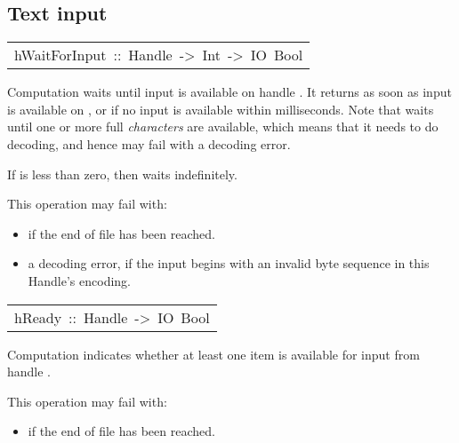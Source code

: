 \subsection{Text input
}
\begin{haddockdesc}
\item[\begin{tabular}{@{}l}
hWaitForInput\ ::\ Handle\ ->\ Int\ ->\ IO\ Bool
\end{tabular}]\haddockbegindoc
Computation  
 waits until input is available on handle .
 It returns  as soon as input is available on ,
 or  if no input is available within  milliseconds.  Note that
  waits until one or more full \emph{characters} are available,
 which means that it needs to do decoding, and hence may fail
 with a decoding error.
\par
If  is less than zero, then  waits indefinitely.
\par
This operation may fail with:
\par
\begin{itemize}
\item
  if the end of file has been reached.
\par

\item
 a decoding error, if the input begins with an invalid byte sequence
    in this Handle's encoding.
\par

\end{itemize}

\end{haddockdesc}
\begin{haddockdesc}
\item[\begin{tabular}{@{}l}
hReady\ ::\ Handle\ ->\ IO\ Bool
\end{tabular}]\haddockbegindoc
Computation   indicates whether at least one item is
 available for input from handle .
\par
This operation may fail with:
\par
\begin{itemize}
\item
  if the end of file has been reached.
\par

\end{itemize}

\end{haddockdesc}
